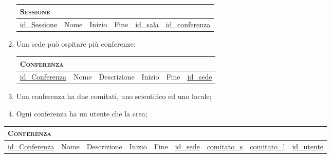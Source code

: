 \begin{enumerate}
	\begin{tabular}{|l|l|l|l|l|l|}
		\multicolumn{4}{l}{\textsc{Sessione}} \\ \hline
		\underline{id\_Sessione} & Nome & Inizio & Fine & \underline{\underline{id\_sala}}& \underline{\underline{id\_conferenza}} \\ \hline
	\end{tabular}

\item Una sede può ospitare più conferenze:

	\begin{tabular}{|l|l|l|l|l|l|}
		\multicolumn{6}{l}{\textsc{Conferenza}} \\ \hline
		\underline{id\_Conferenza} & Nome & Descrizione & Inizio & Fine & \underline{\underline{id\_sede}} \\ \hline
	\end{tabular}

\item Una conferenza ha due comitati, uno scientifico ed uno locale;

	
\item Ogni conferenza ha un utente che la crea;

\end{enumerate}
\begin{tabular}{|l|l|l|l|l|l|l|l|l|}
	\multicolumn{6}{l}{\textsc{Conferenza}} \\ \hline
	\underline{id\_Conferenza} & Nome & Descrizione & Inizio & Fine & \underline{\underline{id\_sede}} & \underline{\underline{comitato\_s}}& \underline{\underline{comitato\_l}} & \underline{\underline{id\_utente}}\\ \hline
\end{tabular}
